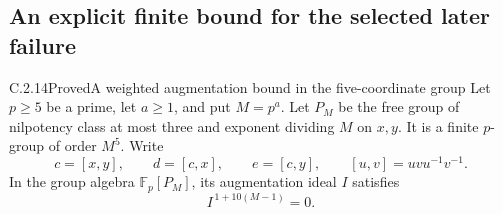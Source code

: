 \subsection{An explicit finite bound for the selected later failure}

\begin{result}{C.2.14}{Proved}{A weighted augmentation bound in the five-coordinate group}
\label{lem:ghost-weighted-augmentation}
Let \(p\ge5\) be a prime, let \(a\ge1\), and put \(M=p^a\).
Let \(P_M\) be the free group of nilpotency class at most three
and exponent dividing \(M\) on \(x,y\). It is a finite \(p\)-group
of order \(M^5\). Write
\[
 c=[x,y],\qquad d=[c,x],\qquad e=[c,y],
 \qquad [u,v]=uvu^{-1}v^{-1}.
 \tag{FB.1}
\]
In the group algebra \(\mathbb F_p[P_M]\), its augmentation
ideal \(I\) satisfies
\[
 I^{\,1+10(M-1)}=0.
 \tag{FB.2}
\]
\end{result}
